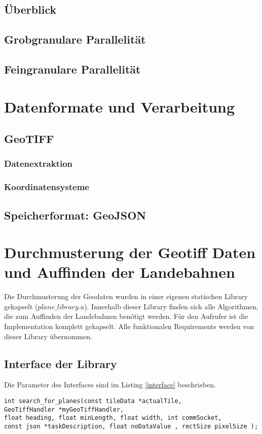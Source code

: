 \documentclass[10pt,a4paper]{report}
\begin{document}
\section{Überblick}
\section{Grobgranulare Parallelität}
\section{Feingranulare Parallelität}

\chapter{Datenformate und Verarbeitung}
\section{GeoTIFF}
\subsection{Datenextraktion}
\subsection{Koordinatensysteme}
\section{Speicherformat: GeoJSON}

\chapter{Durchmusterung der Geotiff Daten und Auffinden der Landebahnen}
Die Durchmusterung der Geodaten wurden in einer eigenen statischen Library gekapselt ($plane\_library.a$). Innerhalb dieser Library finden sich alle Algorithmen, die zum Auffinden der Landebahnen benötigt werden. Für den Aufrufer ist die Implementation komplett gekapselt. Alle funktionalen Requirements werden von dieser Library übernommen.


\section{Interface der Library}

Die Parameter des Interfaces sind im Listing \ref{interface} beschrieben.

\begin{lstlisting}[caption=Interface Beschreibung, label=interface]
int search_for_planes(const tileData *actualTile, 
GeoTiffHandler *myGeoTiffHandler, 
float heading, float minLength, float width, int commSocket,
const json *taskDescription, float noDataValue , rectSize pixelSize );
\end{lstlisting}
\end{document}
